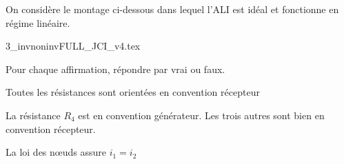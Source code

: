 \hauteurLargeurCadreReponse		{5.25mm}{2.5cm}
\initialisationEntrainement


On considère le montage ci-dessous dans lequel l’ALI est idéal et fonctionne en régime linéaire. 
\vspace{-1mm}
\shorthandoff{!:}
\begin{center}
  {3_invnoninvFULL_JCI_v4.tex}
\end{center}
\shorthandon{!:}

\vspace{-2mm}

Pour chaque affirmation, répondre par vrai ou faux.

\vspace{-1mm}

\debutEntrainement



\begin{enonce}
  Toutes les résistances sont orientées en convention récepteur
\end{enonce}


\begin{corrige}
  La résistance \(R_{4}\) est en convention générateur. Les trois autres sont bien en convention récepteur.
\end{corrige}




\begin{enonce}
  La loi des nœuds assure \(i_{1} = i_{2}\)
\end{enonce}





